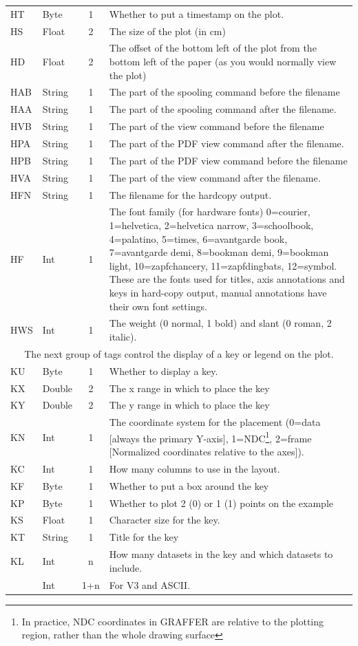 \documentclass[english]{article}
\begin{document}
\begin{longtable}{|llcp{9cm}|}
  HT& Byte& 1&
  Whether to put a timestamp on the plot.\\
  HS& Float& 2&
  The size of the plot (in cm)\\
  HD& Float& 2& The offset of the bottom left of the plot from the
  bottom left of the
  paper (as you would normally view the plot)\\
  HAB& String& 1&
  The part of the spooling command before the filename\\
  HAA& String& 1&
  The part of the spooling command after the filename.\\
  HVB& String& 1&
  The part of the view command before the filename\\
  HPA& String& 1&
  The part of the PDF view command after the filename.\\
  HPB& String& 1&
  The part of the PDF view command before the filename\\
  HVA& String& 1&
  The part of the view command after the filename.\\
  HFN& String & 1 & The filename for the hardcopy output.\\
  HF& Int& 1& The font family (for hardware fonts) 0=courier,
  1=helvetica, 2=helvetica narrow, 3=schoolbook, 4=palatino, 5=times,
  6=avantgarde book, 7=avantgarde demi, 8=bookman demi, 9=bookman
  light, 10=zapfchancery, 11=zapfdingbats, 12=symbol. These are the
  fonts used for titles, axis annotations and keys
  in hard-copy output, manual annotations have their own font settings.\\
  HWS& Int& 1&
  The weight (0 normal, 1 bold) and slant (0 roman, 2 italic).\\
  \hline \multicolumn{4}{|c|}{The next group of tags control the
    display of a key or legend on the
    plot.}\\
  \hline KU& Byte& 1&
  Whether to display a key.\\
  KX& Double& 2&
  The x range in which to place the key\\
  KY& Double& 2&
  The y range in which to place the key\\
  KN& Int& 1& The coordinate system for the placement (0=data [always
  the primary Y-axis], 1=NDC\footnote{In practice, NDC coordinates in
    GRAFFER are relative to the plotting region, rather than the whole
    drawing surface}, 2=frame [Normalized
  coordinates relative to the axes]).\\
  KC& Int& 1&
  How many columns to use in the layout.\\
  KF& Byte& 1&
  Whether to put a box around the key\\
  KP& Byte& 1&
  Whether to plot 2 (0) or 1 (1) points on the example\\
  KS & Float & 1 & Character size for the key.\\
  KT& String& 1&
  Title for the key\\
  KL& Int& n&
  How many datasets in the key and which datasets to include.\\
  & Int& 1+n&
  For V3 and ASCII.\\
\end{longtable}
\end{document}

